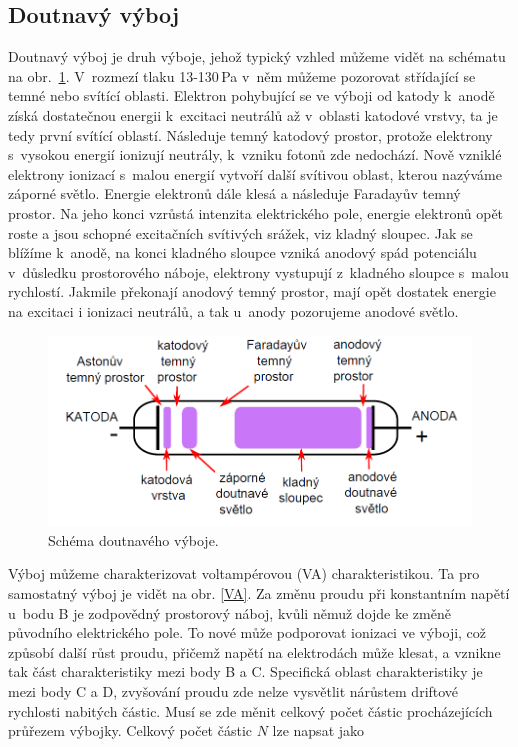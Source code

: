 \documentclass[a4paper,12pt]{article}
\begin{document}
\subsection{Doutnavý výboj}
Doutnavý výboj je druh výboje, jehož typický vzhled můžeme vidět na schématu na 
obr.~\ref{glowdischarge}. V~rozmezí tlaku 13-130\,\si{\pascal} v~něm můžeme 
pozorovat střídající se temné nebo svítící oblasti. Elektron pohybující se ve 
výboji od katody k~anodě získá dostatečnou energii k~excitaci neutrálů až 
v~oblasti katodové vrstvy, ta je tedy první svítící oblastí. Následuje temný 
katodový prostor, protože elektrony s~vysokou energií ionizují neutrály, 
k~vzniku fotonů zde nedochází. Nově vzniklé elektrony ionizací s~malou energií 
vytvoří další svítivou oblast, kterou nazýváme záporné světlo. Energie 
elektronů dále klesá a následuje Faradayův temný prostor. Na jeho konci vzrůstá 
intenzita elektrického pole, energie elektronů opět roste a jsou schopné 
excitačních svítivých srážek, viz kladný sloupec. Jak se blížíme k~anodě, na 
konci kladného sloupce vzniká anodový spád potenciálu v~důsledku prostorového 
náboje, elektrony vystupují z~kladného sloupce s~malou rychlostí. Jakmile 
překonají anodový temný prostor, mají opět dostatek energie na excitaci i 
ionizaci neutrálů, a tak u~anody pozorujeme anodové světlo.

\begin{figure}[h]
	\centering
	\includegraphics[width=130mm]{glowdischarge.png}
	\caption{Schéma doutnavého výboje.}
	\label{glowdischarge}
\end{figure}

Výboj můžeme charakterizovat voltampérovou (VA) charakteristikou. Ta pro 
samostatný výboj je vidět na obr. \ref{VA}. Za změnu proudu při konstantním 
napětí u~bodu B je zodpovědný prostorový náboj, kvůli němuž dojde ke změně 
původního elektrického pole. To nové může podporovat ionizaci ve výboji, což 
způsobí další růst proudu, přičemž napětí na elektrodách může klesat, a vznikne 
tak část charakteristiky mezi body B a C. Specifická oblast charakteristiky je 
mezi body C a D, zvyšování proudu zde nelze vysvětlit nárůstem driftové 
rychlosti nabitých částic. Musí se zde měnit celkový počet částic 
procházejících průřezem výbojky. Celkový počet částic $N$ lze napsat jako
\end{document}
